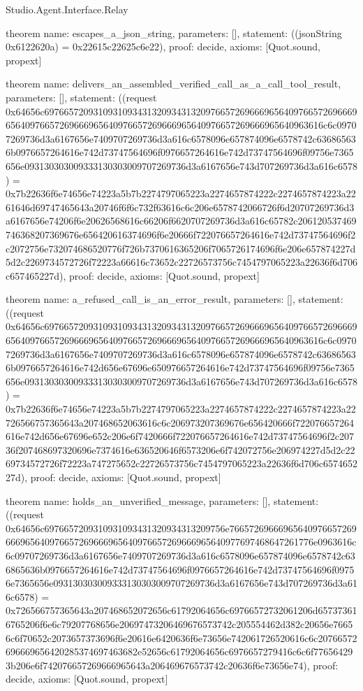 \begin{lexlean}{Studio.Agent.Interface.Relay}
\begin{semanticmodule}
theorem{
  name: escapes_a_json_string,
  parameters: [],
  statement: ((jsonString 0x6122620a) = 0x22615c22625c6e22),
  proof: decide{},
  axioms: [Quot.sound, propext]
}

theorem{
  name: delivers_an_assembled_verified_call_as_a_call_tool_result,
  parameters: [],
  statement: ((request 0x64656c697665720931093109343132093431320976657269666965640976657269666965640976657269666965640976657269666965640976657269666965640963616c6c09707269736d3a6167656e7409707269736d3a616c6578096e657874096e6578742c636865636b0976657264616e742d73747564696f0976657264616e742d73747564696f09756e7365656e093130303009333130303009707269736d3a6167656e743d707269736d3a616c6578) = 0x7b22636f6e74656e74223a5b7b2274797065223a2274657874222c2274657874223a2261646d69747465643a20746f6f6c732f63616c6c206e6578742066726f6d20707269736d3a6167656e74206f6e20626568616c66206f6620707269736d3a616c65782c206120537469746368207369676e656420616374696f6e20666f722076657264616e742d73747564696f2c2072756e732074686520776f726b7370616365206f7065726174696f6e206e657874227d5d2c2269734572726f72223a66616c73652c22726573756c7454797065223a22636f6d706c657465227d),
  proof: decide{},
  axioms: [Quot.sound, propext]
}

theorem{
  name: a_refused_call_is_an_error_result,
  parameters: [],
  statement: ((request 0x64656c697665720931093109343132093431320976657269666965640976657269666965640976657269666965640976657269666965640976657269666965640963616c6c09707269736d3a6167656e7409707269736d3a616c6578096e657874096e6578742c636865636b0976657264616e742d656e67696e650976657264616e742d73747564696f09756e7365656e093130303009333130303009707269736d3a6167656e743d707269736d3a616c6578) = 0x7b22636f6e74656e74223a5b7b2274797065223a2274657874222c2274657874223a22726566757365643a207468652063616c6c206973207369676e656420666f722076657264616e742d656e67696e652c206e6f7420666f722076657264616e742d73747564696f2c20736f207468697320696e7374616e636520646f6573206e6f742072756e206974227d5d2c2269734572726f72223a747275652c22726573756c7454797065223a22636f6d706c657465227d),
  proof: decide{},
  axioms: [Quot.sound, propext]
}

theorem{
  name: holds_an_unverified_message,
  parameters: [],
  statement: ((request 0x64656c6976657209310931093431320934313209756e76657269666965640976657269666965640976657269666965640976657269666965640977697468647261776e0963616c6c09707269736d3a6167656e7409707269736d3a616c6578096e657874096e6578742c636865636b0976657264616e742d73747564696f0976657264616e742d73747564696f09756e7365656e093130303009333130303009707269736d3a6167656e743d707269736d3a616c6578) = 0x726566757365643a207468652072656c61792064656c69766572732061206d657373616765206f6e6c79207768656e20697473206469676573742c205554462d382c20656e76656c6f70652c2073657373696f6e20616e6420636f6e73656e742061726520616c6c20766572696669656420285374697463682e52656c61792064656c6976657279416c6c6f776564293b206e6f742076657269666965643a206469676573742c20636f6e73656e74),
  proof: decide{},
  axioms: [Quot.sound, propext]
}


\end{semanticmodule}
\end{lexlean}

